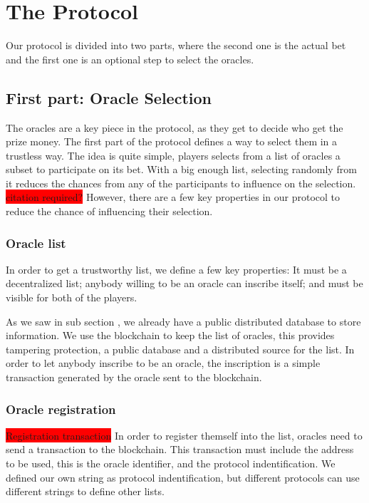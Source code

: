 \section{The Protocol}

Our protocol is divided into two parts, where the second one is the actual bet
  and the first one is an optional step to select the oracles.

\subsection{First part: Oracle Selection}

The oracles are a key piece in the protocol, as they get to decide who get
  the prize money.
The first part of the protocol defines a way to select them in a trustless
  way.
The idea is quite simple, players selects from a list of oracles a subset
  to participate on its bet.
With a big enough list, selecting randomly from it reduces the
  chances from any of the participants to influence on the selection.
\colorbox{red}{citation required?}
However, there are a few key properties in our protocol to reduce the chance
  of influencing their selection.

\subsubsection{Oracle list}

In order to get a trustworthy list, we define a few key properties:
It must be a decentralized list; anybody willing to be an oracle can inscribe
  itself; and must be visible for both of the players.

As we saw in sub section \label{subsec:Blockchain}, we already have a
  public distributed database to store information.
We use the blockchain to keep the list of oracles, this provides tampering
  protection, a public database and a distributed source for the list.
In order to let anybody inscribe to be an oracle, the inscription is a simple
 transaction generated by the oracle sent to the blockchain.

\subsubsection{Oracle registration}
\colorbox{red}{Registration transaction}
In order to register themself into the list, oracles need to send a transaction
  to the blockchain.
This transaction must include the address to be used, this is the oracle
  identifier, and the protocol indentification.
We defined our own string as protocol indentification, but different protocols
  can use different strings to define other lists.

